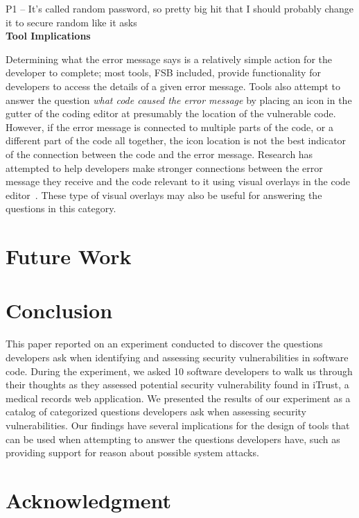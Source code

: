 \documentclass[conference]{IEEEtran}
\begin{document}
P1 -- It's called random password, so pretty big hit that I should probably change it to secure random like it asks
\\

\noindent\textbf{Tool Implications}

Determining what the error message says is a relatively simple action for the developer to complete; most tools, FSB included, provide functionality for developers to access the details of a given error message. 
Tools also attempt to answer the question \emph{what code caused the error message} by placing an icon in the gutter of the coding editor at presumably the location of the vulnerable code. 
However, if the error message is connected to multiple parts of the code, or a different part of the code all together, the icon location is not the best indicator of the connection between the code and the error message. 
Research has attempted to help developers make stronger connections between the error message they receive and the code relevant to it using visual overlays in the code editor~\cite{barik14visual}.
These type of visual overlays may also be useful for answering the questions in this category.


\section{Future Work}
\label{sec:fw}

\section{Conclusion}
\label{sec:concl}
This paper reported on an experiment conducted to discover the questions developers ask when identifying and assessing security vulnerabilities in software code.
During the experiment, we asked 10 software developers to walk us through their thoughts as they assessed potential security vulnerability found in iTrust, a medical records web application.
We presented the results of our experiment as a catalog of categorized questions developers ask when assessing security vulnerabilities.
Our findings have several implications for the design of tools that can be used when attempting to answer the questions developers have, such as providing support for reason about possible system attacks.






\section*{Acknowledgment}
\end{document}
